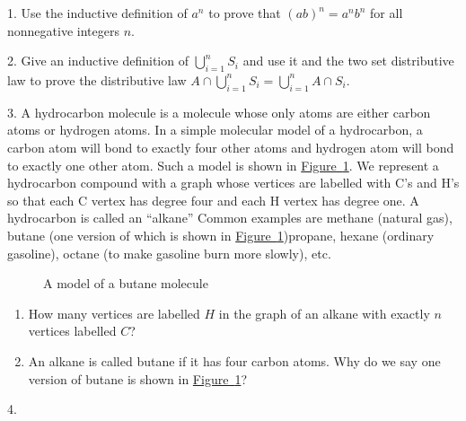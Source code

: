 \documentclass[10pt,]{book}
\theoremstyle{plain}
\theoremstyle{definition}
\theoremstyle{definition}
\numberwithin{equation}{chapter}
\newcommand{\importantarrow}{\Rightarrow}
\begin{document}
\begin{exerciselist}
\item[1.]\marginsymbol[-1em]{} \hypertarget{exercise-13}{}\hypertarget{p-690}{}%
Use the inductive definition of \(a^n\) to prove that \((ab)^n=a^nb^n\) for all nonnegative integers \(n\).%
\par\smallskip
\item[2.]\marginsymbol[-1em]{} \hypertarget{exercise-14}{}\hypertarget{p-693}{}%
Give an inductive definition of \(\displaystyle \bigcup_{i=1}^nS_i\) and use it and the two set distributive law to prove the distributive law \(\displaystyle{A\cap \bigcup_{i=1}^n S_i=\bigcup_{i=1}^n A\cap S_i}\).%
\par\smallskip
\item[3.]\marginsymbol[-1em]{\pdftooltip{$\importantarrow$}{especially interesting}} \hypertarget{exercise-15}{}\hypertarget{p-697}{}%
A hydrocarbon molecule is a molecule whose only atoms are either carbon atoms or hydrogen atoms.  In a simple molecular model of a hydrocarbon, a carbon atom will bond to exactly four other atoms and hydrogen atom will bond to exactly one other atom. Such a model is shown in \hyperref[butane]{Figure~\ref{butane}}. We represent a hydrocarbon compound with a graph whose vertices are labelled with C's and H's so that each C vertex has degree four and each H vertex has degree one.  A hydrocarbon is called an ``alkane'' Common examples are methane (natural gas), butane (one version of which is shown in \hyperref[butane]{Figure~\ref{butane}})propane, hexane (ordinary gasoline), octane (to make gasoline burn more slowly), etc.%
\begin{figure}
\centering
{
}
\caption{A model of a butane molecule\label{butane}}
\end{figure}
\hypertarget{p-698}{}%
\leavevmode%
\begin{enumerate}[label=(\alph*)]
\item\hypertarget{li-31}{}How many vertices are labelled \(H\) in the graph of an alkane with exactly \(n\) vertices labelled \(C\)?%
\item\hypertarget{li-32}{}An alkane is called butane if it has four carbon atoms. Why do we say one version of butane is shown in \hyperref[butane]{Figure~\ref{butane}}?%
\end{enumerate}
%
\par\smallskip
\item[4.]\marginsymbol[-1em]{} \hypertarget{exercise-16}{}\hypertarget{p-701}{}%

\end{exerciselist}
\end{document}
